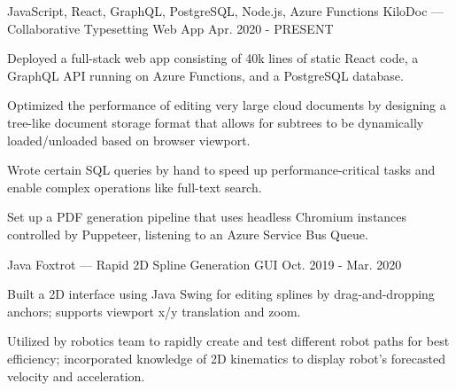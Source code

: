 
\begin{cventries}
  \cventry
  {JavaScript, React, GraphQL, PostgreSQL, Node.js, Azure Functions} %
  {KiloDoc --- Collaborative Typesetting Web App} %
  {} %
  {Apr. 2020 - PRESENT} %
  {
    \begin{cvitems} %
      \item {Deployed a full-stack web app consisting of 40k lines of static React code, a GraphQL API running on Azure Functions, and a PostgreSQL database.}
      \item {Optimized the performance of editing very large cloud documents by designing a tree-like document storage format that allows for subtrees to be dynamically loaded/unloaded based on browser viewport.}
      \item {Wrote certain SQL queries by hand to speed up performance-critical tasks and enable complex operations like full-text search.}
      \item {Set up a PDF generation pipeline that uses headless Chromium instances controlled by Puppeteer, listening to an Azure Service Bus Queue.}
    \end{cvitems}
  }

  \cventry
  {Java} %
  {Foxtrot --- Rapid 2D Spline Generation GUI} %
  {} %
  {Oct. 2019 - Mar. 2020} %
  {
    \begin{cvitems} %
      \item {Built a 2D interface using Java Swing for editing splines by drag-and-dropping anchors; supports viewport x/y translation and zoom.}
      \item {Utilized by robotics team to rapidly create and test different robot paths for best efficiency; incorporated knowledge of 2D kinematics to display robot's forecasted velocity and acceleration.}
    \end{cvitems}
  }
\end{cventries}
